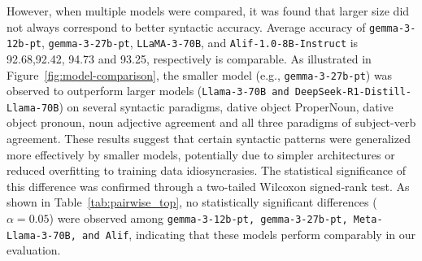 \documentclass[11pt]{article}
\begin{document}
However, when multiple models were compared, it was found that larger size did not always correspond to better syntactic accuracy. Average accuracy of \texttt{gemma-3-12b-pt}, \texttt{gemma-3-27b-pt}, \texttt{LLaMA-3-70B}, and \texttt{Alif-1.0-8B-Instruct} is 92.68,92.42, 94.73 and 93.25, respectively is comparable.
As illustrated in Figure~\ref{fig:model-comparison}, the smaller model (e.g., \texttt{gemma-3-27b-pt}) was observed to outperform larger models (\texttt{Llama-3-70B and DeepSeek-R1-Distill-Llama-70B}) on several syntactic paradigms, dative object ProperNoun, dative object pronoun, noun adjective agreement and all three paradigms of  subject-verb agreement. These results suggest that certain syntactic patterns were generalized more effectively by smaller models, potentially due to simpler architectures or reduced overfitting to training data idiosyncrasies.
 The statistical significance of this difference was confirmed through a two-tailed Wilcoxon signed-rank test.  As shown in Table~\ref{tab:pairwise_top}, no statistically significant differences ($\alpha = 0.05$) were observed among \texttt{gemma-3-12b-pt, gemma-3-27b-pt, Meta-Llama-3-70B, and Alif}, indicating that these models perform comparably in our evaluation.
\begin{table}[h]
\caption{Pairwise comparisons of top-performing models using Wilcoxon signed-rank test with Holm correction. No statistically significant differences were found among the top models at $\alpha = 0.05$.}
\label{tab:pairwise_top}
\end{table}
\end{document}
